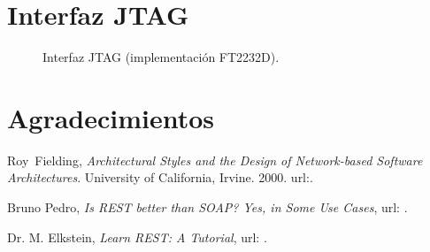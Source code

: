\documentclass[conference]{IEEEtran}
\begin{document}
\section{Interfaz JTAG}
\label{sec:jtag}

\lipsum[45-48]

\begin{figure}[!t]
  \centerline{
  \hfil
  \hfil
  }
  \caption{Interfaz JTAG (implementación FT2232D).}
  \label{fig:oocdlink}
\end{figure}

\section*{Agradecimientos}

\lipsum[75-80]

\begin{thebibliography}{1}


  Roy~Fielding, \emph{Architectural Styles and the Design of
    Network-based Software Architectures}. University of California,
  Irvine. 2000. url:\texttt{}.

Bruno Pedro, \emph{Is REST better than SOAP? Yes, in Some Use Cases},
url:
\texttt{}.

  Dr. M. Elkstein, \emph{Learn REST: A Tutorial},
url: \texttt{}.




\end{thebibliography}

\end{document}
